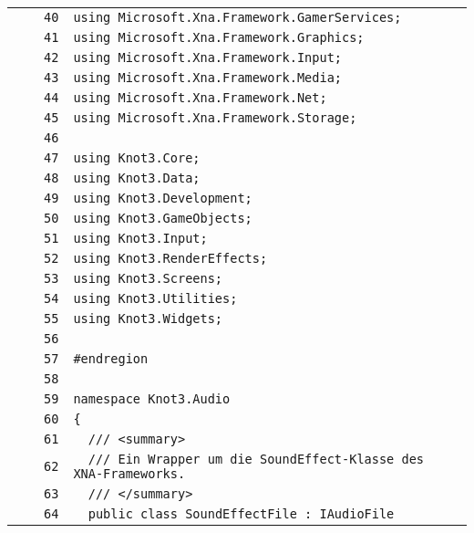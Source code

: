 \documentclass[a4paper,10pt]{article}
\begin{document}
\begin{longtable}[l]{lrrl}
\cellcolor{gray} &  & \verb~40~ & \verb~using Microsoft.Xna.Framework.GamerServices;~\\
\cellcolor{gray} &  & \verb~41~ & \verb~using Microsoft.Xna.Framework.Graphics;~\\
\cellcolor{gray} &  & \verb~42~ & \verb~using Microsoft.Xna.Framework.Input;~\\
\cellcolor{gray} &  & \verb~43~ & \verb~using Microsoft.Xna.Framework.Media;~\\
\cellcolor{gray} &  & \verb~44~ & \verb~using Microsoft.Xna.Framework.Net;~\\
\cellcolor{gray} &  & \verb~45~ & \verb~using Microsoft.Xna.Framework.Storage;~\\
\cellcolor{gray} &  & \verb~46~ & \verb~~\\
\cellcolor{gray} &  & \verb~47~ & \verb~using Knot3.Core;~\\
\cellcolor{gray} &  & \verb~48~ & \verb~using Knot3.Data;~\\
\cellcolor{gray} &  & \verb~49~ & \verb~using Knot3.Development;~\\
\cellcolor{gray} &  & \verb~50~ & \verb~using Knot3.GameObjects;~\\
\cellcolor{gray} &  & \verb~51~ & \verb~using Knot3.Input;~\\
\cellcolor{gray} &  & \verb~52~ & \verb~using Knot3.RenderEffects;~\\
\cellcolor{gray} &  & \verb~53~ & \verb~using Knot3.Screens;~\\
\cellcolor{gray} &  & \verb~54~ & \verb~using Knot3.Utilities;~\\
\cellcolor{gray} &  & \verb~55~ & \verb~using Knot3.Widgets;~\\
\cellcolor{gray} &  & \verb~56~ & \verb~~\\
\cellcolor{gray} &  & \verb~57~ & \verb~#endregion~\\
\cellcolor{gray} &  & \verb~58~ & \verb~~\\
\cellcolor{gray} &  & \verb~59~ & \verb~namespace Knot3.Audio~\\
\cellcolor{gray} &  & \verb~60~ & \verb~{~\\
\cellcolor{gray} &  & \verb~61~ & \verb~  /// <summary>~\\
\cellcolor{gray} &  & \verb~62~ & \verb~  /// Ein Wrapper um die SoundEffect-Klasse des XNA-Frameworks.~\\
\cellcolor{gray} &  & \verb~63~ & \verb~  /// </summary>~\\
\cellcolor{gray} &  & \verb~64~ & \verb~  public class SoundEffectFile : IAudioFile~\\

\end{longtable}
\end{document}
